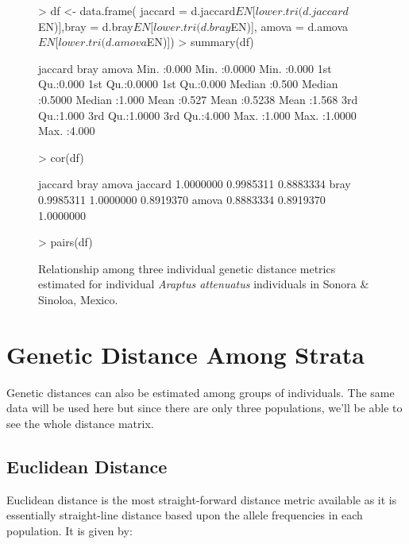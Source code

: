 \documentclass[letterpaper,twoside,openany]{book}
\begin{document}
\begin{figure}[bth]
	\centering
\begin{Schunk}
\begin{Sinput}
> df <- data.frame( jaccard = d.jaccard$EN[lower.tri(d.jaccard$EN)],bray = d.bray$EN[lower.tri(d.bray$EN)], amova = d.amova$EN[lower.tri(d.amova$EN)])
> summary(df)
\end{Sinput}
\begin{Soutput}
    jaccard           bray            amova      
 Min.   :0.000   Min.   :0.0000   Min.   :0.000  
 1st Qu.:0.000   1st Qu.:0.0000   1st Qu.:0.000  
 Median :0.500   Median :0.5000   Median :1.000  
 Mean   :0.527   Mean   :0.5238   Mean   :1.568  
 3rd Qu.:1.000   3rd Qu.:1.0000   3rd Qu.:4.000  
 Max.   :1.000   Max.   :1.0000   Max.   :4.000  
\end{Soutput}
\begin{Sinput}
> cor(df)
\end{Sinput}
\begin{Soutput}
          jaccard      bray     amova
jaccard 1.0000000 0.9985311 0.8883334
bray    0.9985311 1.0000000 0.8919370
amova   0.8883334 0.8919370 1.0000000
\end{Soutput}
\begin{Sinput}
> pairs(df)
\end{Sinput}
\end{Schunk}
	\caption{Relationship among three individual genetic distance metrics estimated for individual \emph{Araptus attenuatus} individuals in Sonora \& Sinoloa, Mexico.}
	\label{fig:sonora_ind_dist}
\end{figure}




\clearpage

\section{Genetic Distance Among Strata}


Genetic distances can also be estimated among groups of individuals.  The same data will be used here but since there are only three populations, we'll be able to see the whole distance matrix. 


\subsection{Euclidean Distance}

Euclidean distance is the most straight-forward distance metric available as it is essentially straight-line distance based upon the allele frequencies in each population.  It is given by:
\end{document}
